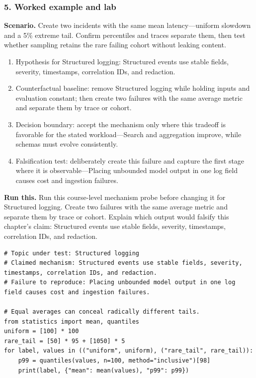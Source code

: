 \subsubsection*{5. Worked example and lab}
\textbf{Scenario.} Create two incidents with the same mean latency—uniform slowdown and a 5\% extreme tail. Confirm percentiles and traces separate them, then test whether sampling retains the rare failing cohort without leaking content.
\begin{enumerate}
\item Hypothesis for Structured logging: Structured events use stable fields, severity, timestamps, correlation IDs, and redaction.
\item Counterfactual baseline: remove Structured logging while holding inputs and evaluation constant; then create two failures with the same average metric and separate them by trace or cohort.
\item Decision boundary: accept the mechanism only where this tradeoff is favorable for the stated workload—Search and aggregation improve, while schemas must evolve consistently.
\item Falsification test: deliberately create this failure and capture the first stage where it is observable—Placing unbounded model output in one log field causes cost and ingestion failures.
\end{enumerate}
\textbf{Run this.} Run this course-level mechanism probe before changing it for Structured logging. Create two failures with the same average metric and separate them by trace or cohort. Explain which output would falsify this chapter's claim: Structured events use stable fields, severity, timestamps, correlation IDs, and redaction.
\begin{Verbatim}[fontsize=\scriptsize]
# Topic under test: Structured logging
# Claimed mechanism: Structured events use stable fields, severity, timestamps, correlation IDs, and redaction.
# Failure to reproduce: Placing unbounded model output in one log field causes cost and ingestion failures.

# Equal averages can conceal radically different tails.
from statistics import mean, quantiles
uniform = [100] * 100
rare_tail = [50] * 95 + [1050] * 5
for label, values in (("uniform", uniform), ("rare_tail", rare_tail)):
    p99 = quantiles(values, n=100, method="inclusive")[98]
    print(label, {"mean": mean(values), "p99": p99})
\end{Verbatim}

